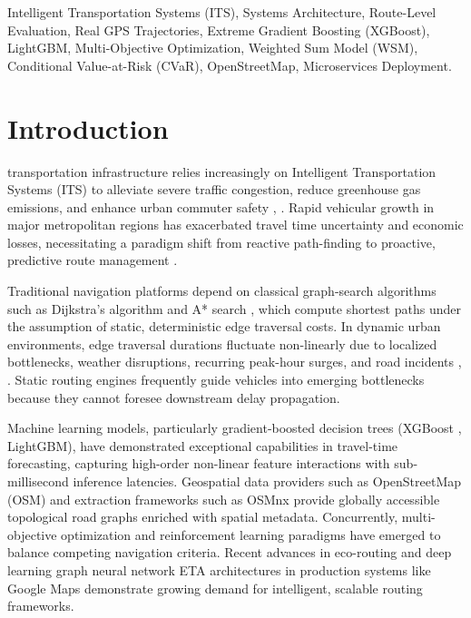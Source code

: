 \documentclass[journal]{IEEEtran}
\begin{document}
\begin{IEEEkeywords}
Intelligent Transportation Systems (ITS), Systems Architecture, Route-Level Evaluation, Real GPS Trajectories, Extreme Gradient Boosting (XGBoost), LightGBM, Multi-Objective Optimization, Weighted Sum Model (WSM), Conditional Value-at-Risk (CVaR), OpenStreetMap, Microservices Deployment.
\end{IEEEkeywords}

\section{Introduction}
 transportation infrastructure relies increasingly on Intelligent Transportation Systems (ITS) to alleviate severe traffic congestion, reduce greenhouse gas emissions, and enhance urban commuter safety \cite{ref1}, \cite{ref2}. Rapid vehicular growth in major metropolitan regions has exacerbated travel time uncertainty and economic losses, necessitating a paradigm shift from reactive path-finding to proactive, predictive route management \cite{ref3}.

Traditional navigation platforms depend on classical graph-search algorithms such as Dijkstra's algorithm \cite{ref4} and A* search \cite{ref5}, which compute shortest paths under the assumption of static, deterministic edge traversal costs. In dynamic urban environments, edge traversal durations fluctuate non-linearly due to localized bottlenecks, weather disruptions, recurring peak-hour surges, and road incidents \cite{ref6}, \cite{ref7}. Static routing engines frequently guide vehicles into emerging bottlenecks because they cannot foresee downstream delay propagation.

Machine learning models, particularly gradient-boosted decision trees (XGBoost \cite{ref8}, LightGBM), have demonstrated exceptional capabilities in travel-time forecasting, capturing high-order non-linear feature interactions with sub-millisecond inference latencies. Geospatial data providers such as OpenStreetMap (OSM) \cite{ref9} and extraction frameworks such as OSMnx \cite{ref10} provide globally accessible topological road graphs enriched with spatial metadata. Concurrently, multi-objective optimization \cite{ref11} and reinforcement learning paradigms \cite{ref12} have emerged to balance competing navigation criteria. Recent advances in eco-routing \cite{ref13} and deep learning graph neural network ETA architectures in production systems like Google Maps \cite{ref14} demonstrate growing demand for intelligent, scalable routing frameworks.
\end{document}
